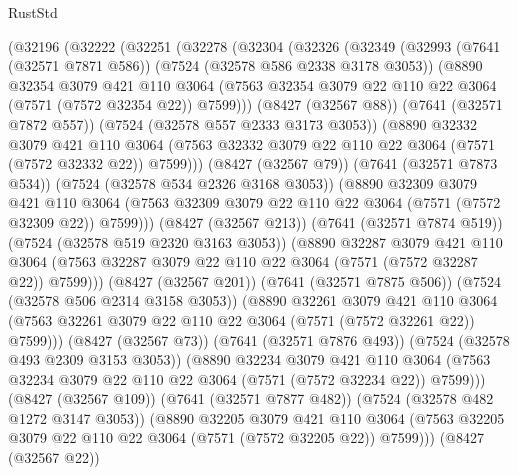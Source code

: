 \begin{lexlean}{RustStd}
\begin{coremodule}
{\begin{coremodule}
{{{{{{{{{{{{{{{{{{{{{{{{{{{{{{{{    (@32196
      (@32222
        (@32251
          (@32278
            (@32304
              (@32326
                (@32349
                  (@32993
                    (@7641 (@32571 @7871 @586))
                    (@7524 (@32578 @586 @2338 @3178 @3053))
                    (@8890
                      @32354
                      @3079
                      @421
                      @110
                      @3064
                      (@7563 @32354 @3079 @22 @110 @22 @3064 (@7571 (@7572 @32354 @22)) @7599)))
                  (@8427 (@32567 @88))
                  (@7641 (@32571 @7872 @557))
                  (@7524 (@32578 @557 @2333 @3173 @3053))
                  (@8890
                    @32332
                    @3079
                    @421
                    @110
                    @3064
                    (@7563 @32332 @3079 @22 @110 @22 @3064 (@7571 (@7572 @32332 @22)) @7599)))
                (@8427 (@32567 @79))
                (@7641 (@32571 @7873 @534))
                (@7524 (@32578 @534 @2326 @3168 @3053))
                (@8890
                  @32309
                  @3079
                  @421
                  @110
                  @3064
                  (@7563 @32309 @3079 @22 @110 @22 @3064 (@7571 (@7572 @32309 @22)) @7599)))
              (@8427 (@32567 @213))
              (@7641 (@32571 @7874 @519))
              (@7524 (@32578 @519 @2320 @3163 @3053))
              (@8890
                @32287
                @3079
                @421
                @110
                @3064
                (@7563 @32287 @3079 @22 @110 @22 @3064 (@7571 (@7572 @32287 @22)) @7599)))
            (@8427 (@32567 @201))
            (@7641 (@32571 @7875 @506))
            (@7524 (@32578 @506 @2314 @3158 @3053))
            (@8890
              @32261
              @3079
              @421
              @110
              @3064
              (@7563 @32261 @3079 @22 @110 @22 @3064 (@7571 (@7572 @32261 @22)) @7599)))
          (@8427 (@32567 @73))
          (@7641 (@32571 @7876 @493))
          (@7524 (@32578 @493 @2309 @3153 @3053))
          (@8890
            @32234
            @3079
            @421
            @110
            @3064
            (@7563 @32234 @3079 @22 @110 @22 @3064 (@7571 (@7572 @32234 @22)) @7599)))
        (@8427 (@32567 @109))
        (@7641 (@32571 @7877 @482))
        (@7524 (@32578 @482 @1272 @3147 @3053))
        (@8890
          @32205
          @3079
          @421
          @110
          @3064
          (@7563 @32205 @3079 @22 @110 @22 @3064 (@7571 (@7572 @32205 @22)) @7599)))
      (@8427 (@32567 @22))
}}}}}}}}}}}}}}}}}}}}}}}}}}}}}}}}
\end{coremodule}}
\end{coremodule}
\end{lexlean}
